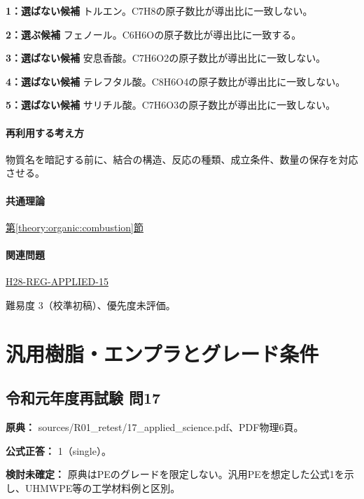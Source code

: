 \noindent\textbf{1：選ばない候補} トルエン。C7H8の原子数比が導出比に一致しない。\par

\noindent\textbf{2：選ぶ候補} フェノール。C6H6Oの原子数比が導出比に一致する。\par

\noindent\textbf{3：選ばない候補} 安息香酸。C7H6O2の原子数比が導出比に一致しない。\par

\noindent\textbf{4：選ばない候補} テレフタル酸。C8H6O4の原子数比が導出比に一致しない。\par

\noindent\textbf{5：選ばない候補} サリチル酸。C7H6O3の原子数比が導出比に一致しない。\par

\paragraph{再利用する考え方} 物質名を暗記する前に、結合の構造、反応の種類、成立条件、数量の保存を対応させる。

\paragraph{共通理論} \hyperref[theory:organic:combustion]{第\ref*{theory:organic:combustion}節}

\paragraph{関連問題} \hyperref[q:h28-reg-applied-15]{H28-REG-APPLIED-15}

\par 難易度 3（校準初稿）、優先度未評価。

\section{汎用樹脂・エンプラとグレード条件}

\subsection{令和元年度再試験 問17}
\label{q:r01-ret-applied-17}

\noindent\textbf{原典：} sources/R01\_retest/17\_applied\_science.pdf、PDF物理6頁。

\textbf{公式正答：} 1（single）。

\par\textbf{検討未確定：} 原典はPEのグレードを限定しない。汎用PEを想定した公式1を示し、UHMWPE等の工学材料例と区別。

